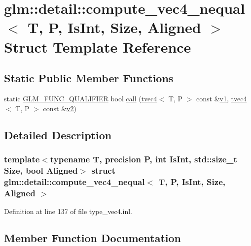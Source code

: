 \hypertarget{structglm_1_1detail_1_1compute__vec4__nequal}{}\section{glm\+::detail\+::compute\+\_\+vec4\+\_\+nequal$<$ T, P, Is\+Int, Size, Aligned $>$ Struct Template Reference}
\label{structglm_1_1detail_1_1compute__vec4__nequal}
\subsection*{Static Public Member Functions}
\begin{DoxyCompactItemize}
\item 
static \mbox{\hyperlink{setup_8hpp_a33fdea6f91c5f834105f7415e2a64407}{G\+L\+M\+\_\+\+F\+U\+N\+C\+\_\+\+Q\+U\+A\+L\+I\+F\+I\+ER}} bool \mbox{\hyperlink{structglm_1_1detail_1_1compute__vec4__nequal_a0f2c01fc5028a0357e1fb8e3ee4188a8}{call}} (\mbox{\hyperlink{structglm_1_1tvec4}{tvec4}}$<$ T, P $>$ const \&\mbox{\hyperlink{glad_8h_a0779c3b73f9aa3a0ac5b0139b5d291d9}{v1}}, \mbox{\hyperlink{structglm_1_1tvec4}{tvec4}}$<$ T, P $>$ const \&\mbox{\hyperlink{glad_8h_a9a09a1837922b2b806f4589096a52049}{v2}})
\end{DoxyCompactItemize}


\subsection{Detailed Description}
\subsubsection*{template$<$typename T, precision P, int Is\+Int, std\+::size\+\_\+t Size, bool Aligned$>$\newline
struct glm\+::detail\+::compute\+\_\+vec4\+\_\+nequal$<$ T, P, Is\+Int, Size, Aligned $>$}



Definition at line 137 of file type\+\_\+vec4.\+inl.



\subsection{Member Function Documentation}
\mbox{\label{structglm_1_1detail_1_1compute__vec4__nequal_a0f2c01fc5028a0357e1fb8e3ee4188a8}} 
